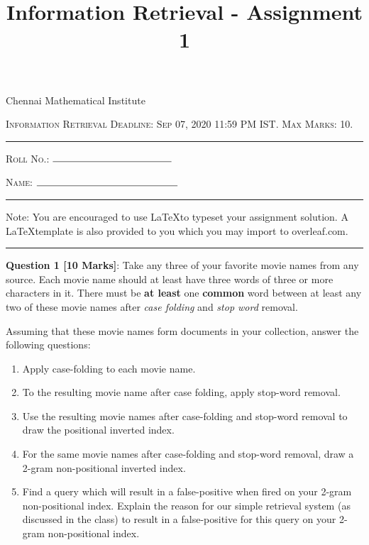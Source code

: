 \documentclass[12pt]{article}
\title{Information Retrieval - Assignment 1}
\begin{document}
{\scshape} \hfill {Chennai Mathematical Institute}  \hfill {\scshape}

\bigskip

{\scshape Information Retrieval} \hfill { } \hfill {\scshape Deadline: Sep 07, 2020 11:59 PM IST. Max Marks: 10.}

\bigskip

\hrule

\bigskip
{\scshape Roll No.: $\rule{4.2cm}{0.15mm}$} \hfill {\scshape}\hfill {\scshape}

\smallskip

{\scshape Name: $\rule{5cm}{0.15mm}$} \hfill {\scshape }\hfill {\scshape}

\bigskip

\smallskip

\bigskip

\hrule
\smallskip
Note: You are encouraged to use \LaTeX to typeset your assignment solution. A \LaTeX template is also provided to you which you may import to overleaf.com. 
\smallskip
\hrule

\bigskip

\textbf{Question 1 [10 Marks]}: Take any three of your favorite movie names from any source. Each movie name should at least have three words of three or more characters in it. There must be \textbf{at least} one \textbf{common} word between at least any two of these movie names after \textit{case folding} and \textit{stop word} removal. 

Assuming that these movie names form documents in your collection, answer the following questions:

\begin{enumerate}
    \item Apply case-folding to each movie name.
    \item To the resulting movie name after case folding, apply stop-word removal.
    \item Use the resulting movie names after case-folding and stop-word removal to draw the positional inverted index.
    \item For the same movie names after case-folding and stop-word removal, draw a 2-gram non-positional inverted index.
    \item Find a query which will result in a false-positive when fired on your 2-gram non-positional index. Explain the reason for our simple retrieval system (as discussed in the class) to result in a false-positive for this query on your 2-gram non-positional index.
\end{enumerate}
\end{document}
